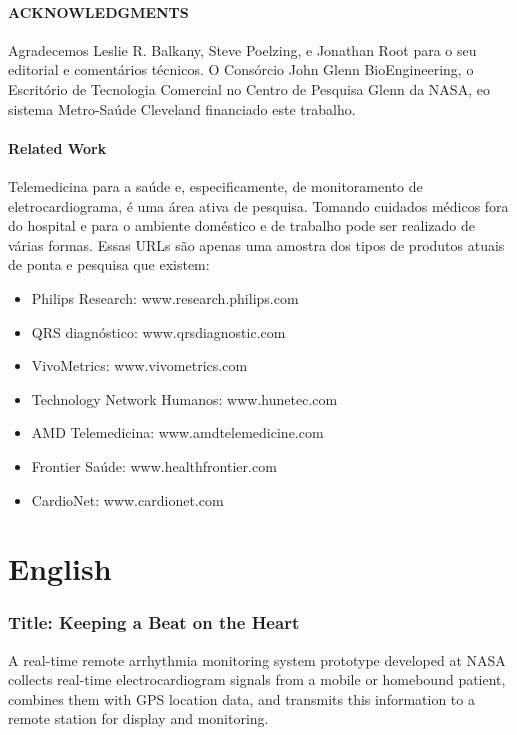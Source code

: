 \documentclass[a4paper,12pt]{article}
\begin{document}
\subsection{ACKNOWLEDGMENTS}

Agradecemos Leslie R. Balkany, Steve Poelzing, e Jonathan Root para o seu editorial e comentários técnicos. O Consórcio John Glenn BioEngineering, o Escritório de Tecnologia Comercial no Centro de Pesquisa Glenn da NASA, eo sistema Metro-Saúde Cleveland financiado este trabalho.

\subsection{Related Work}

Telemedicina para a saúde e, especificamente, de monitoramento de eletrocardiograma, é uma área ativa de pesquisa. Tomando cuidados médicos fora do hospital e para o ambiente doméstico e de trabalho pode ser realizado de várias formas. Essas URLs são apenas uma amostra dos tipos de produtos atuais de ponta e pesquisa que existem:
\begin{itemize}
	\item Philips Research: www.research.philips.com
	\item QRS diagnóstico: www.qrsdiagnostic.com
	\item VivoMetrics: www.vivometrics.com
	\item Technology Network Humanos: www.hunetec.com
	\item AMD Telemedicina: www.amdtelemedicine.com
	\item Frontier Saúde: www.healthfrontier.com
	\item CardioNet: www.cardionet.com
\end{itemize}








\part{English}


\section{Title: Keeping a Beat on the Heart}


A real-time remote arrhythmia monitoring system prototype developed at NASA collects real-time electrocardiogram signals from a mobile or homebound patient, combines them with GPS location data, and transmits this information to a remote station for display and monitoring.
\end{document}

